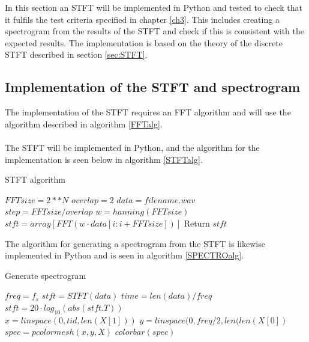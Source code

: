 In this section an STFT will be implemented in Python and tested to check that it fulfils the test criteria specified in chapter \ref{ch3}. This includes creating a spectrogram from the results of the STFT and check if this is consistent with the expected results. The implementation is based on the theory of the discrete STFT described in section \ref{sec:STFT}.

\subsection{Implementation of the STFT and spectrogram}
The implementation of the STFT requires an FFT algorithm and will use the algorithm described in algorithm \ref{FFTalg}.
\\ \\
The STFT will be implemented in Python, and the algorithm for the implementation is seen below in algorithm \ref{STFTalg}.
\begin{algorithm}[H]
\caption{STFT algorithm}
\label{STFTalg}
\begin{algorithmic}[1]
\State $FFTsize=2**N$ 
\State $overlap=2$ 
\State $data = filename.wav$ \\
\State $step=FFTsize/overlap$
\State $w=hanning(FFTsize)$ 
\State $stft = array[FFT(w\cdot data[i:i+FFTsize])]$
\EndFor
\State Return $stft$
\EndProcedure
\end{algorithmic}
\end{algorithm}

The algorithm for generating a spectrogram from the STFT is likewise implemented in Python and is seen in algorithm \ref{SPECTROalg}.
\begin{algorithm}[H]
\caption{Generate spectrogram}
\label{SPECTROalg}
\begin{algorithmic}[1]
\State $freq=f_s$ 
\State $stft=STFT(data)$ 
\State $time=len(data)/freq$ 
\State $stft=20\cdot log_{10}(abs(stft.T))$ \\
\State $x=linspace(0,tid,len(X[1]))$ 
\State $y=linspace(0,freq/2,len(len(X[0])$ \\
\State $spec=pcolormesh(x,y,X)$ 
\State $colorbar(spec)$ 
\end{algorithmic}
\end{algorithm}

